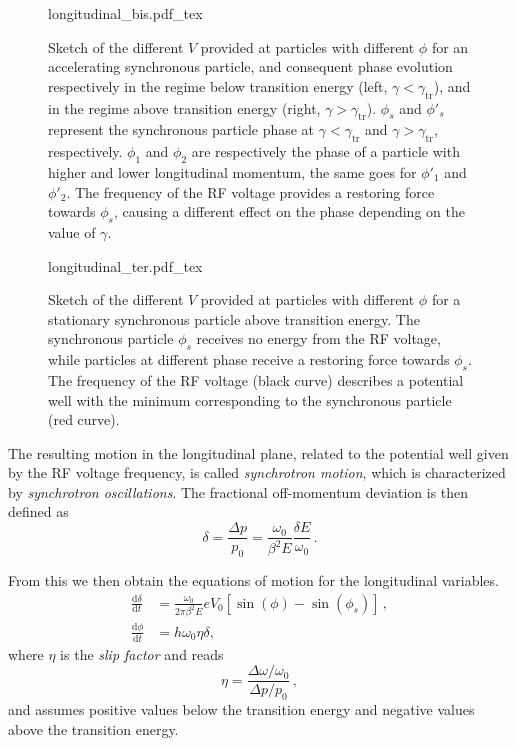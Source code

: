 \begin{figure}[p]
    \centering
    \def\svgwidth{0.85\columnwidth}
    {longitudinal_bis.pdf_tex}
    \caption{Sketch of the different $V$ provided at particles with different $\phi$ for an accelerating synchronous particle, and consequent phase evolution respectively in the regime below transition energy (left, $\gamma < \gamma_\text{tr}$), and in the regime above transition energy (right, $\gamma > \gamma_\text{tr}$). $\phi_s$ and $\phi'_s$ represent the synchronous particle phase at $\gamma < \gamma_\text{tr}$ and $\gamma > \gamma_\text{tr}$, respectively. $\phi_1$ and $\phi_2$ are respectively the phase of a particle with higher and lower longitudinal momentum, the same goes for $\phi'_1$ and $\phi'_2$. The frequency of the RF voltage provides a restoring force towards $\phi_s$, causing a different effect on the phase depending on the value of $\gamma$.}
    \label{fig:long_1}

    \vspace{\floatsep}
    
    \def\svgwidth{0.85\columnwidth}
    {longitudinal_ter.pdf_tex}
    \caption{Sketch of the different $V$ provided at particles with different $\phi$ for a stationary synchronous particle above transition energy. The synchronous particle $\phi_s$ receives no energy from the RF voltage, while particles at different phase receive a restoring force towards $\phi_s$. The frequency of the RF voltage (black curve) describes a potential well with the minimum corresponding to the synchronous particle (red curve).}
    \label{fig:long_2}
\end{figure}

The resulting motion in the longitudinal plane, related to the potential well given by the RF voltage frequency, is called \textit{synchrotron motion}, which is characterized by \textit{synchrotron oscillations}. The fractional off-momentum deviation is then defined as
\begin{equation}
    \delta=\frac{\Delta p}{p_0}=\frac{\omega_0}{\beta^2 E} \frac{\delta E}{\omega_0} \,.
\end{equation}

From this we then obtain the equations of motion for the longitudinal variables.
\begin{equation}
    \begin{aligned}
    \frac{\mathrm{d} \delta}{\mathrm{d} t} &=\frac{\omega_0}{2 \pi \beta^2 E} e V_0\left[\sin (\phi)-\sin \left(\phi_s\right)\right] \,, \\
    \frac{\mathrm{d} \phi}{\mathrm{d} t} &=h \omega_0 \eta \delta,
    \end{aligned}
\end{equation}
where $\eta$ is the \textit{slip factor} and reads
\begin{equation}
    \eta=\frac{\Delta \omega / \omega_0}{\Delta p / p_0} \,,
\end{equation}
and assumes positive values below the transition energy and negative values above the transition energy.

